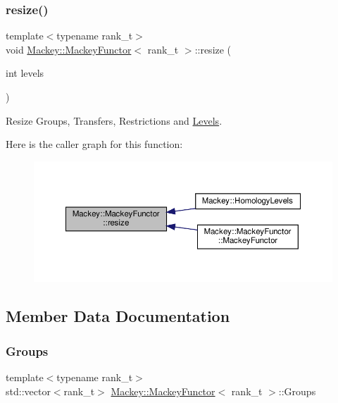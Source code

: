 \subsubsection{\texorpdfstring{resize()}{resize()}}
{\footnotesize\ttfamily template$<$typename rank\+\_\+t$>$ \\
void \hyperlink{classMackey_1_1MackeyFunctor}{Mackey\+::\+Mackey\+Functor}$<$ rank\+\_\+t $>$\+::resize (\begin{DoxyParamCaption}\item[{int}]{levels }\end{DoxyParamCaption})\hspace{0.3cm}{\ttfamily [inline]}}



Resize Groups, Transfers, Restrictions and \hyperlink{classMackey_1_1Levels}{Levels}. 

Here is the caller graph for this function\+:\nopagebreak
\begin{figure}[H]
\begin{center}
\leavevmode
\includegraphics[width=350pt]{classMackey_1_1MackeyFunctor_a44d3104a47f23de5d8141b7800db6d11_icgraph}
\end{center}
\end{figure}


\subsection{Member Data Documentation}
\mbox{\label{classMackey_1_1MackeyFunctor_a4f8f5f7ac6267bdee2a67c8874bdd9a3}} 
\subsubsection{\texorpdfstring{Groups}{Groups}}
{\footnotesize\ttfamily template$<$typename rank\+\_\+t$>$ \\
std\+::vector$<$rank\+\_\+t$>$ \hyperlink{classMackey_1_1MackeyFunctor}{Mackey\+::\+Mackey\+Functor}$<$ rank\+\_\+t $>$\+::Groups}



